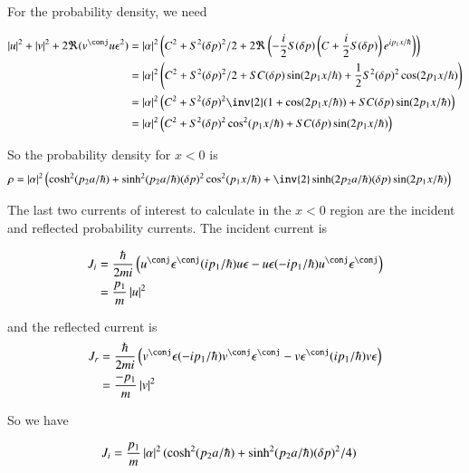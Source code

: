 \documentclass{article}
\begin{document}
For the probability density, we need

\begin{align*}
\Abs{u}^2 + \Abs{v}^2 + 2 \Re(v^\conj u \epsilon^2) 
&=
\Abs{\alpha}^2 \left(C^2 + S^2 (\delta p)^2/2 
+ 2\Re\left(
-\frac{i}{2} S (\delta p) \left(C + \frac{i}{2} S (\delta p)\right) e^{i p_1 x/\hbar}
\right)\right) \\
&=
\Abs{\alpha}^2 \left(C^2 + S^2 (\delta p)^2/2 
+ S C (\delta p) \sin( 2 p_1 x/\hbar)
+\frac{1}{2} S^2 (\delta p)^2 \cos( 2 p_1 x/\hbar)
\right) \\
&=
\Abs{\alpha}^2 \left(C^2 + S^2 (\delta p)^2 \inv{2}(1 + \cos( 2 p_1 x/\hbar))
+ S C (\delta p) \sin( 2 p_1 x/\hbar)
\right) \\
&=
\Abs{\alpha}^2 \left(C^2 + S^2 (\delta p)^2 \cos^2( p_1 x/\hbar)
+ S C (\delta p) \sin( 2 p_1 x/\hbar)
\right) \\
\end{align*}

So the probability density for $x<0$ is
\begin{align}
\rho 
&=
\Abs{\alpha}^2 \left(\cosh^2(p_2 a/\hbar) + \sinh^2(p_2 a/\hbar) (\delta p)^2 \cos^2( p_1 x/\hbar)
+ \inv{2} \sinh(2 p_2 a/\hbar) (\delta p) \sin( 2 p_1 x/\hbar)
\right)
\end{align}

The last two currents of interest to calculate in the $x<0$ region are the incident and reflected probability currents.  The
incident current is

\begin{align*}
J_i 
&=
\frac{\hbar}{2m i}\left( 
u^\conj \epsilon^\conj (ip_1/\hbar) u \epsilon
-u \epsilon (-ip_1/\hbar) u^\conj \epsilon^\conj 
\right)
\\
&=
\frac{p_1}{m} \Abs{u}^2
\end{align*}

and the reflected current is
\begin{align*}
J_r 
&=
\frac{\hbar}{2m i}\left( 
v^\conj \epsilon (-ip_1/\hbar) v^\conj \epsilon^\conj
-v \epsilon^\conj (ip_1/\hbar) v \epsilon
\right) \\
&=
\frac{-p_1}{m} \Abs{v}^2
\end{align*}

So we have

\begin{align}\label{eqn:JiBarrier}
J_i
&= \frac{p_1}{m} \left\lvert{\alpha}\right\rvert^2 (\cosh^2(p_2 a/\hbar) + \sinh^2(p_2 a/\hbar) (\delta p)^2/4)
\end{align}
\end{document}
